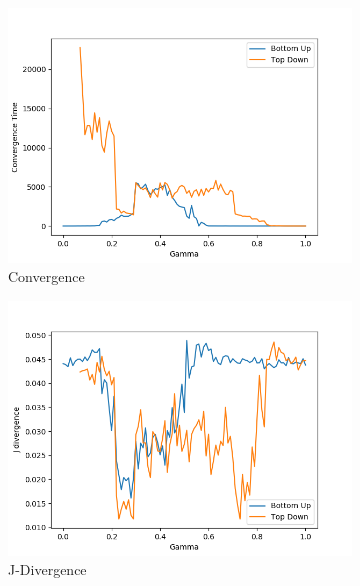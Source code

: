 \begin{figure}[H]
 \centering
  \begin{subfigure}[ht]{0.45\textwidth}
    \includegraphics[width=\textwidth]{Images/Figures/All/Convergence_ALL_n_3_p_100_gamma_100_runs_20.png}
    \caption{Convergence}
 \end{subfigure}
 \hfill
 \begin{subfigure}[ht]{0.45\textwidth}
    \includegraphics[width=\textwidth]{Images/Figures/All/J_Div_ALL_n_3_p_100_gamma_100_runs_20.png}
    \caption{J-Divergence}
 \end{subfigure}
 \hfill
 \begin{subfigure}[ht]{0.45\textwidth}

\end{subfigure}
\end{figure}
